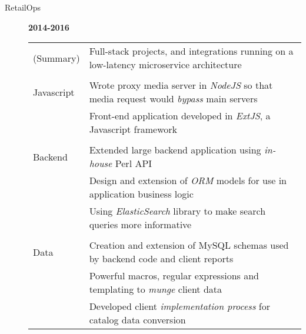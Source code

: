 \documentclass[12pt]{article}
\begin{document}
\begin{description}
\begin{description}
                \item[RetailOps] \hfill \textbf{2014-2016}\\
                    \begin{tabular}{l|l}
                        (Summary)  & Full-stack projects, and integrations running on a low-latency microservice architecture\\
				\\[-1.7mm]
                        Javascript & Wrote proxy media server in \textit{NodeJS} so that media request would \textit{bypass} main servers \\
				   & Front-end application developed in \textit{ExtJS}, a Javascript framework\\
				\\[-1.7mm]
                        Backend    & Extended large backend application using \textit{in-house} Perl API \\
                                   & Design and extension of \textit{ORM} models for use in application business logic \\
                                   & Using \textit{ElasticSearch} library to make search queries more informative\\
				\\[-1.7mm]
                        Data       & Creation and extension of MySQL schemas used by backend code and client reports\\
                                   & Powerful macros, regular expressions and templating to \textit{munge} client data\\
                        	   & Developed client \textit{implementation process} for catalog data conversion\\
                    \end{tabular}
            \end{description}


\end{description}
\end{document}

